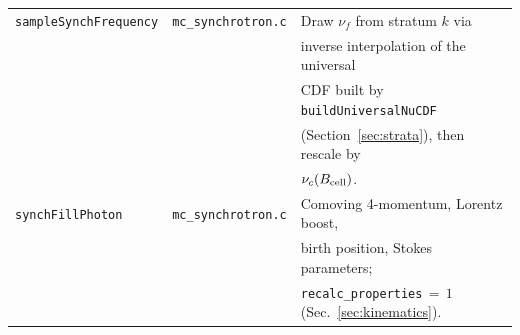 \documentclass[12pt,a4paper]{article}
\newcommand{\nuf}{\nu_{\!f}}
\newcommand{\nuc}{\nu_c}
\newcommand{\code}[1]{\texttt{#1}}
\begin{document}
\begin{table}[h]
\begin{longtable}{p{} p{} p{}}
		\midrule
		\code{sampleSynchFrequency}
		& \code{mc\_synchrotron.c}
		& Draw $\nuf$ from stratum $k$ via \\
		& & inverse interpolation of the universal \\
		& & CDF built by \code{buildUniversalNuCDF} \\
		& & (Section~\ref{sec:strata}), then rescale by \\
		& & $\nuc(B_{\rm cell})$. \\
		\midrule
		\code{synchFillPhoton}
		& \code{mc\_synchrotron.c}
		& Comoving 4-momentum, Lorentz boost, \\
		& & birth position, Stokes parameters; \\
		& & \code{recalc\_properties}$\,{=}\,1$
		(Sec.~\ref{sec:kinematics}). \\
		\bottomrule
	\end{longtable}
\end{table}
\end{document}
